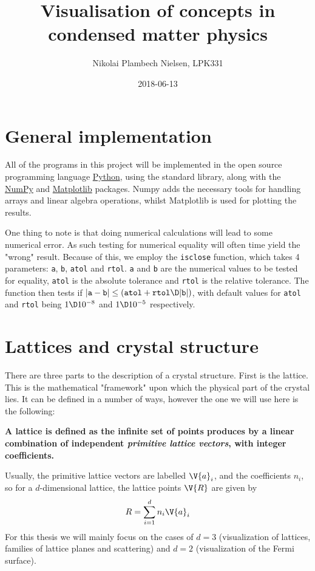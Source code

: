 \documentclass[a4paper,10pt]{article}
\title{Visualisation of concepts in condensed matter physics}
\author{Nikolai Plambech Nielsen, LPK331}
\date{2018-06-13}
\numberwithin{equation}{section}
\begin{document}
	
	\maketitle
	
	\tableofcontents
	
	\section{General implementation}
	All of the programs in this project will be implemented in the open source programming language \href{www.python.org}{Python}, using the standard library, along with the \href{www.numpy.org}{NumPy} and \href{www.matplotlib.org}{Matplotlib} packages. Numpy adds the necessary tools for handling arrays and linear algebra operations, whilst Matplotlib is used for plotting the results.
	
	One thing to note is that doing numerical calculations will lead to some numerical error. As such testing for numerical equality will often time yield the "wrong" result. Because of this, we employ the \texttt{isclose} function, which takes 4 parameters: \texttt{a}, \texttt{b}, \texttt{atol} and \texttt{rtol}. \texttt{a} and \texttt{b} are the numerical values to be tested for equality, \texttt{atol} is the absolute tolerance and \texttt{rtol} is the relative tolerance. The function then tests if $|\texttt{a}-\texttt{b}| \leq (\texttt{atol}+ \texttt{rtol} \D |\texttt{b}|)$, with default values for \texttt{atol} and \texttt{rtol} being $ 1 \D 10^{-8} $ and $ 1 \D 10^{-5} $ respectively.
	
	\section{Lattices and crystal structure}
	There are three parts to the description of a crystal structure. First is the lattice. This is the mathematical "framework" upon which the physical part of the crystal lies. It can be defined in a number of ways, however the one we will use here is the following:
	
	\textbf{A lattice is defined as the infinite set of points produces by a linear combination of independent \emph{primitive lattice vectors}, with integer coefficients.}
	
	Usually, the primitive lattice vectors are labelled $ \V{a}_i $, and the coefficients $ n_i $, so for a $ d $-dimensional lattice, the lattice points $ \V{R} $ are given by
	\begin{equation}\label{key}
		R = \sum_{i = 1}^{d} n_i \V{a}_i
	\end{equation}
	For this thesis we will mainly focus on the cases of $ d = 3 $ (visualization of lattices, families of lattice planes and scattering) and $ d = 2 $ (visualization of the Fermi surface).
	
\end{document}
